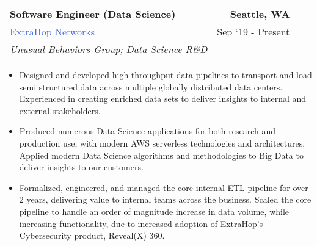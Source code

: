 \documentclass[10pt]{article}
\newcommand{\highlightcolor}{RoyalBlue}
\newcommand{\tabularxwidth}{\textwidth}
\begin{document}
    \begin{minipage}{\tabularxwidth}

        \begin{tabularx}{\tabularxwidth}{X r}
            \textbf{Software Engineer (Data Science)} & \textbf{Seattle, 
        WA} \\
            
    
    
    

    
        \textcolor{\highlightcolor}{ExtraHop Networks} & 
        
    Sep ‘19 - Present \\
        
            \textit{Unusual Behaviors Group;}
                \textit{Data Science R\&D} & \\
        
    
            
        \end{tabularx}

        \begin{itemize}[noitemsep, topsep=3pt, parsep=0pt, partopsep=0pt]
            
                \item 
    Designed and developed high throughput data pipelines to transport and load semi structured data across multiple globally distributed data centers. Experienced in creating enriched data sets to deliver insights to internal and external stakeholders.
            
                \item 
    Produced numerous Data Science applications for both research and production use, with modern AWS serverless technologies and architectures. Applied modern Data Science algorithms and methodologies to Big Data to deliver insights to our customers.
            
                \item 
    Formalized, engineered, and managed the core internal ETL pipeline for over 2 years, delivering value to internal teams across the business. Scaled the core pipeline to handle an order of magnitude increase in data volume, while increasing functionality, due to increased adoption of ExtraHop's Cybersecurity product, Reveal(X) 360.
            

\end{itemize}
\end{minipage}
\end{document}
